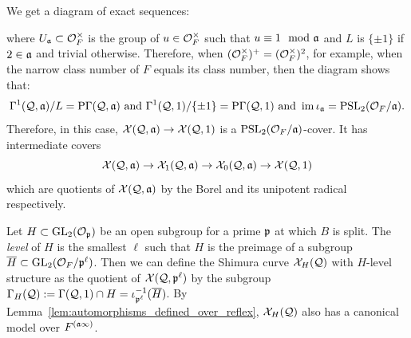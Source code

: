 \documentclass[main.tex]{subfiles}
\begin{document}
We get a diagram of exact sequences:
\begin{center}
\end{center}
where $U_{\aa} \subset \cO^\times_F$ is the group of $u \in \cO_F^{\times}$ such that $u \equiv 1 \mod \aa$ and $L$ is $\{ \pm 1 \}$ if $2 \in \aa$ and trivial otherwise. Therefore, when $(\cO_F^\times)^+ = (\cO_F^\times)^2$, for example, when the narrow class number of $F$ equals its class number, then the diagram shows that:
\[ \Gamma^1(\cQ, \aa) / L = \mathrm{P} \Gamma(\cQ, \aa) \text{ and } \Gamma^1(\cQ, 1) / \{ \pm 1 \} = \mathrm{P} \Gamma(\cQ, 1) \text{ and } \im{\iota_{\aa}} = \PSL_2(\cO_F / \aa). \]
Therefore, in this case, $\X(\cQ, \aa) \to \X(\cQ, 1)$ is a $\PSL_2(\cO_F / \aa)$-cover. It has intermediate covers
\[ \X(\cQ, \aa) \to \X_1(\cQ, \aa) \to \X_0(\cQ, \aa) \to \X(\cQ, 1) \]
which are quotients of $\X(\cQ, \aa)$ by the Borel and its unipotent radical respectively.

Let $H \subset \GL_2(\cO_{\p})$ be an open subgroup for a prime $\p$ at which $B$ is split. The \textit{level} of $H$ is the smallest $\ell$ such that $H$ is the preimage of a subgroup $\ol{H} \subset \GL_2(\cO_F / \p^{\ell})$. Then we can define the Shimura curve $\X_H(\cQ)$ with $H$-level structure as the quotient of $\X(\cQ, \p^{\ell})$ by the subgroup $\Gamma_H(\cQ) := \Gamma(\cQ, 1) \cap H = \iota_{\p^{\ell}}^{-1}(\ol{H})$. By Lemma~\ref{lem:automorphisms_defined_over_reflex}, $\X_H(\cQ)$ also has a canonical model over $F^{(\aa \infty)}$.
\end{document}
